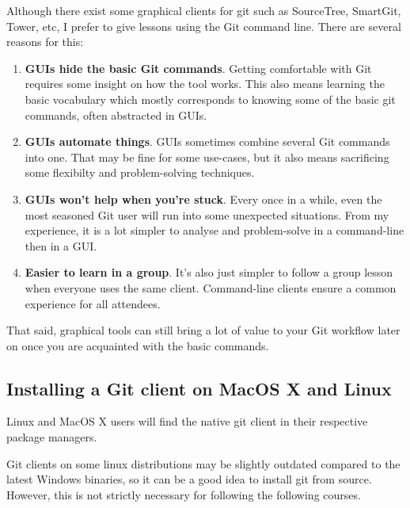 \documentclass{../common/tufte-latex/tufte-handout}
\begin{document}
Although there exist some graphical clients for git such as SourceTree, SmartGit, Tower, etc, I prefer to give lessons using the Git command line. There are several reasons for this:

\begin{enumerate} 
 \item{\textbf{GUIs hide the basic Git commands}. Getting comfortable with Git requires some insight on how the tool works. This also means learning the basic vocabulary which mostly corresponds to knowing some of the basic git commands, often abstracted in GUIs.}
 \item{\textbf{GUIs automate things}.  GUIs sometimes combine several Git commands into one.  That may be fine for some use-cases, but it also means sacrificing some flexibilty and problem-solving techniques.}
 \item{\textbf{GUIs won't help when you're stuck}.  Every once in a while, even the most seasoned Git user will run into some unexpected situations. From my experience, it is a lot simpler to analyse and problem-solve in a command-line then in a GUI.}
 \item{\textbf{Easier to learn in a group}. It's also just simpler to follow a group lesson when everyone uses the same client. Command-line clients ensure a common experience for all attendees.}
\end{enumerate}

That said, graphical tools can still bring a lot of value to your Git workflow later on once you are acquainted with the basic commands.

\subsection{Installing a Git client on MacOS X and Linux}

Linux and MacOS X users will find the native git client in their respective package managers.

Git clients on some linux distributions may be slightly outdated compared to the latest Windows binaries,  so it can be a good idea to install git from source. However, this is not strictly necessary for following the following courses.
\end{document}
